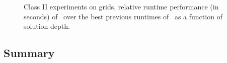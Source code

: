 \begin{figure}
    \begin{center}
%
      \\ %
\vspace{0.025\textwidth}      
		\\ %
    \end{center}
    \vspace{-0.25in} 
    \caption{%
Class II experiments on grids, relative runtime performance (in seconds) of \lexgote \ over the best previous runtimes of \lexgo \ as a function of solution depth.
    }%
    \label{fig:6-13}
\end{figure}

\subsection{Summary}
\label{chapEmpiricalAnalysis:subsec:summarygridslexgote}

